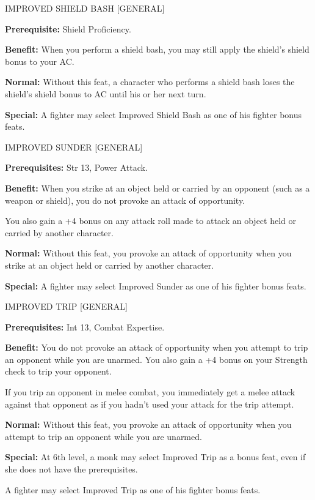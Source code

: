 \documentclass{article}
\begin{document}
\vspace{12pt}
IMPROVED SHIELD BASH [GENERAL]

\textbf{Prerequisite:} Shield Proficiency.

\textbf{Benefit:} When you perform a shield bash, you may still apply the shield's 
shield bonus to your AC.

\textbf{Normal:} Without this feat, a character who performs a shield bash loses 
the shield's shield bonus to AC until his or her next turn.

\textbf{Special:} A fighter may select Improved Shield Bash as one of his fighter 
bonus feats.

\vspace{12pt}
IMPROVED SUNDER [GENERAL]

\textbf{Prerequisites:} Str 13, Power Attack.

\textbf{Benefit:} When you strike at an object held or carried by an opponent (such 
as a weapon or shield), you do not provoke an attack of opportunity.

You also gain a +4 bonus on any attack roll made to attack an object held or carried 
by another character.

\textbf{Normal:} Without this feat, you provoke an attack of opportunity when you 
strike at an object held or carried by another character.

\textbf{Special:} A fighter may select Improved Sunder as one of his fighter bonus 
feats.

\vspace{12pt}
IMPROVED TRIP [GENERAL]

\textbf{Prerequisites:} Int 13, Combat Expertise.

\textbf{Benefit:} You do not provoke an attack of opportunity when you attempt 
to trip an opponent while you are unarmed. You also gain a +4 bonus on your Strength 
check to trip your opponent.

If you trip an opponent in melee combat, you immediately get a melee attack against 
that opponent as if you hadn't used your attack for the trip attempt. 

\textbf{Normal:} Without this feat, you provoke an attack of opportunity when you 
attempt to trip an opponent while you are unarmed.

\textbf{Special:} At 6th level, a monk may select Improved Trip as a bonus feat, 
even if she does not have the prerequisites.

A fighter may select Improved Trip as one of his fighter bonus feats.
\end{document}
